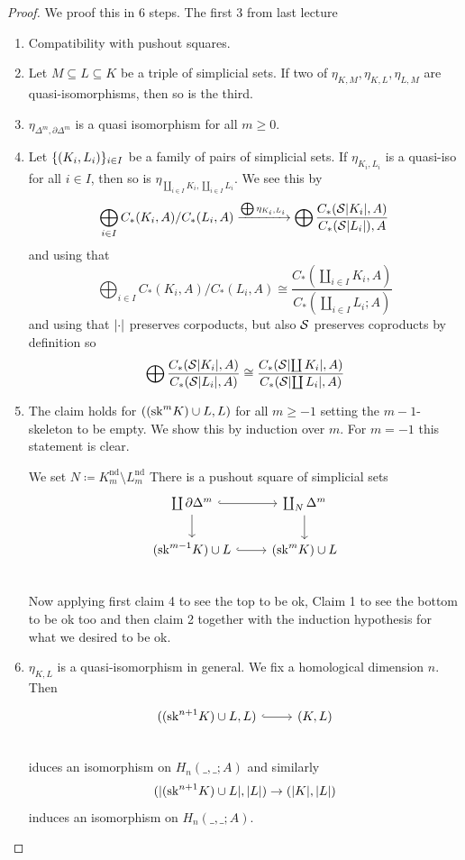 \documentclass[language=english]{TemplateLecture}
\begin{document}
\begin{proof}
    We proof this in 6 steps. The first 3 from last lecture
    \begin{enumerate}
        \item Compatibility with pushout squares.
        \item Let \(M\subseteq L\subseteq K\) be a triple of simplicial sets. If two of \(\eta_{K,M}, \eta_{K,L}, \eta_{L,M}\) are quasi-isomorphisms, then so is the third.
        \item \(\eta_{\Delta^m, \partial\Delta^m}\) is a quasi isomorphism for all \(m\geq 0\).
        \item Let \(\{(K_i, L_i)\}_{i\in I}\) be a family of pairs of simplicial sets. If \(\eta_{K_i, L_i}\) is a quasi-iso for all \(i \in I\), then so is \(\eta_{\coprod_{i\in I}K_i, \coprod_{i\in I} L_i}\). We see this by
        \[\bigoplus_{i\in I} C_*(K_i, A)/C_*(L_i, A) \xrightarrow{\bigoplus \eta_{K_i,L_i}} \bigoplus \frac{C_*(\mathcal{S}\lvert K_i\rvert, A)}{C_*(\mathcal{S}\lvert L_i\rvert), A}\]
        and using that
        \[\bigoplus_{i\in I} C_*(K_i, A)/ C_*(L_i, A) \cong \frac{C_*(\coprod_{i\in I} K_i, A)}{C_*(\coprod_{i\in I} L_i; A)}\]
        and using that \(\lvert\cdot\rvert\) preserves corpoducts, but also \(\mathcal{S}\) preserves coproducts by definition so
        \[\bigoplus\frac{C_*(\mathcal{S}\lvert K_i\rvert, A)}{C_*(\mathcal{S}\lvert L_i\rvert, A)} \cong \frac{C_*(\mathcal{S}\lvert \coprod K_i\rvert, A)}{C_*(\mathcal{S}\lvert\coprod L_i\rvert, A)}\]
        \item The claim holds for \(((\mathrm{sk}^m K) \cup L, L)\) for all \(m \geq -1\) setting the \(m-1\)-skeleton to be empty. We show this by induction over \(m\). For \(m= -1\) this statement is clear.
        
        We set \(N\coloneq K_m^{\mathrm{nd}} \setminus L_m^{\mathrm{nd}}\) There is a pushout square of simplicial sets
        \[\begin{tikzcd}
            \coprod \partial\Delta^m \ar[r, hook] \ar[d] & \coprod_{N} \Delta^m \ar[d] \\
            (\mathrm{sk}^{m-1} K)\cup L \ar[r, hook] & (\sk^m K) \cup L \\
        \end{tikzcd}\]
        Now applying first claim 4 to see the top to be ok, Claim 1 to see the bottom to be ok too and then claim 2 together with the induction hypothesis for what we desired to be ok.
        \item \(\eta_{K,L}\) is a quasi-isomorphism in general. We fix a homological dimension \(n\). Then
        \[\begin{tikzcd}
            ((\sk^{n+1} K)\cup L, L) \ar[r, hook] & (K,L) \\
        \end{tikzcd}\]
        iduces an isomorphism on \(H_n(\_, \_; A)\) and similarly
        \[(\lvert(\mathrm{sk}^{n+1}K) \cup L\rvert, \lvert L\rvert) \to (\lvert K\rvert, \lvert L\rvert)\]
        induces an isomorphism on \(H_n(\_, \_; A)\).
    \end{enumerate}
\end{proof}
\end{document}
